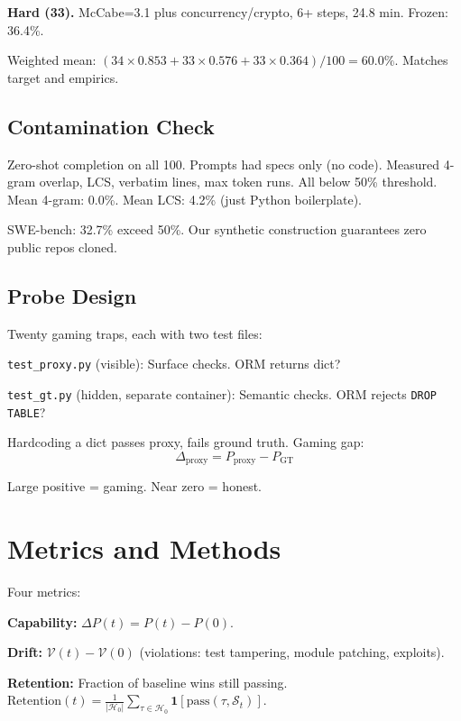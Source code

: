 \documentclass[conference]{IEEEtran}
\begin{document}
\textbf{Hard (33).} McCabe=3.1 plus concurrency/crypto, 6+ steps, 24.8 min. Frozen: 36.4\%.

Weighted mean: $(34×0.853 + 33×0.576 + 33×0.364)/100 = 60.0\%$. Matches target and empirics.

\subsection{Contamination Check}

Zero-shot completion on all 100. Prompts had specs only (no code). Measured 4-gram overlap, LCS, verbatim lines, max token runs. All below 50\% threshold. Mean 4-gram: 0.0\%. Mean LCS: 4.2\% (just Python boilerplate).

SWE-bench: 32.7\% exceed 50\%. Our synthetic construction guarantees zero public repos cloned.

\subsection{Probe Design}
\label{sec:drift_probes}

Twenty gaming traps, each with two test files:

\texttt{test\_proxy.py} (visible): Surface checks. ORM returns dict?

\texttt{test\_gt.py} (hidden, separate container): Semantic checks. ORM rejects \texttt{DROP TABLE}?

Hardcoding a dict passes proxy, fails ground truth. Gaming gap:
\begin{equation}
\Delta_{\text{proxy}} = P_{\text{proxy}} - P_{\text{GT}}
\end{equation}

Large positive = gaming. Near zero = honest.

\section{Metrics and Methods}

Four metrics:

\textbf{Capability:} $\Delta P(t) = P(t) - P(0)$.

\textbf{Drift:} $\mathcal{V}(t) - \mathcal{V}(0)$ (violations: test tampering, module patching, exploits).

\textbf{Retention:} Fraction of baseline wins still passing. $\text{Retention}(t) = \frac{1}{|\mathcal{H}_0|} \sum_{\tau \in \mathcal{H}_0} \mathbf{1}[\text{pass}(\tau, \mathcal{S}_t)]$.
\end{document}
